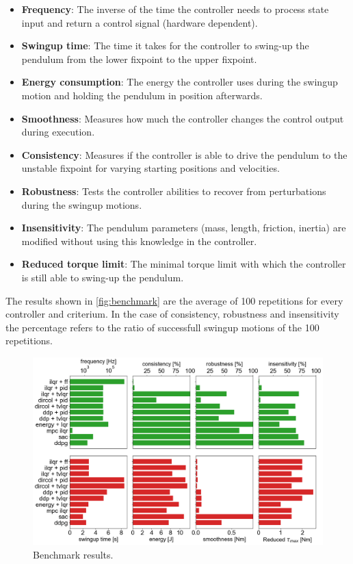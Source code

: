\documentclass[onecolumn, letter paper]{report}
\begin{document}
\begin{itemize}
    \item \textbf{Frequency}: The inverse of the time the controller needs to process state input and return a control signal (hardware dependent).
    \item \textbf{Swingup time}: The time it takes for the controller to swing-up the pendulum from the lower fixpoint to the upper fixpoint.
    \item \textbf{Energy consumption}: The energy the controller uses during the swingup motion and holding the pendulum in position afterwards.
    \item \textbf{Smoothness}: Measures how much the controller changes the control output during execution.
    \item \textbf{Consistency}: Measures if the controller is able to drive the pendulum to the unstable fixpoint for varying starting positions and velocities.
    \item \textbf{Robustness}: Tests the controller abilities to recover from perturbations during the swingup motions.
    \item \textbf{Insensitivity}: The pendulum parameters (mass, length, friction, inertia) are modified without using this knowledge in the controller.
    \item \textbf{Reduced torque limit}: The minimal torque limit with which the controller is still able to swing-up the pendulum.
\end{itemize}

The results shown in \autoref{fig:benchmark} are the average of 100 repetitions for every controller and criterium. In the case of consistency, robustness and insensitivity the percentage refers to the ratio of successfull swingup motions of the 100 repetitions.

\begin{figure}[H]
    \centering
    \includegraphics[width=0.8\linewidth]{figures/benchmark_barplot.png}
    \caption{Benchmark results.}
    \label{fig:benchmark}
\end{figure}
\end{document}
